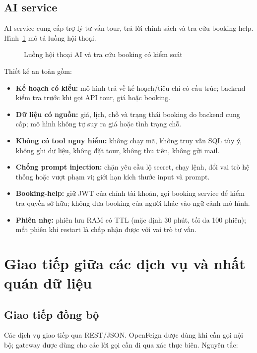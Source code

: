\subsection{AI service}
\label{subsec:ai-service}

AI service cung cấp trợ lý tư vấn tour, trả lời chính sách và tra cứu booking-help. Hình~\ref{fig:sequence-ai} mô tả luồng hội thoại.

\begin{figure}[H]
\centering
\resizebox{\textwidth}{!}{}
\caption{Luồng hội thoại AI và tra cứu booking có kiểm soát}
\label{fig:sequence-ai}
\end{figure}

Thiết kế an toàn gồm:

\begin{itemize}
  \item \textbf{Kế hoạch có kiểu:} mô hình trả về kế hoạch/tiêu chí có cấu trúc; backend kiểm tra trước khi gọi API tour, giá hoặc booking.
  \item \textbf{Dữ liệu có nguồn:} giá, lịch, chỗ và trạng thái booking do backend cung cấp; mô hình không tự suy ra giá hoặc tình trạng chỗ.
  \item \textbf{Không có tool nguy hiểm:} không chạy mã, không truy vấn SQL tùy ý, không ghi dữ liệu, không đặt tour, không thu tiền, không gửi mail.
  \item \textbf{Chống prompt injection:} chặn yêu cầu lộ secret, chạy lệnh, đổi vai trò hệ thống hoặc vượt phạm vi; giới hạn kích thước input và prompt.
  \item \textbf{Booking-help:} giữ JWT của chính tài khoản, gọi booking service để kiểm tra quyền sở hữu; không đưa booking của người khác vào ngữ cảnh mô hình.
  \item \textbf{Phiên nhẹ:} phiên lưu RAM có TTL (mặc định 30 phút, tối đa 100 phiên); mất phiên khi restart là chấp nhận được với vai trò tư vấn.
\end{itemize}

\section{Giao tiếp giữa các dịch vụ và nhất quán dữ liệu}
\label{sec:giao-tiep}

\subsection{Giao tiếp đồng bộ}

Các dịch vụ giao tiếp qua REST/JSON. OpenFeign được dùng khi cần gọi nội bộ; gateway được dùng cho các lời gọi cần đi qua xác thực biên. Nguyên tắc:

